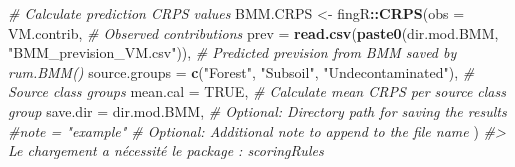 \documentclass[
]{article}
\newenvironment{Shaded}{\begin{snugshade}}{\end{snugshade}}
\newcommand{\AttributeTok}[1]{\textcolor[rgb]{0.13,0.29,0.53}{#1}}
\newcommand{\CommentTok}[1]{\textcolor[rgb]{0.56,0.35,0.01}{\textit{#1}}}
\newcommand{\ConstantTok}[1]{\textcolor[rgb]{0.56,0.35,0.01}{#1}}
\newcommand{\DecValTok}[1]{\textcolor[rgb]{0.00,0.00,0.81}{#1}}
\newcommand{\FunctionTok}[1]{\textcolor[rgb]{0.13,0.29,0.53}{\textbf{#1}}}
\newcommand{\NormalTok}[1]{#1}
\newcommand{\OtherTok}[1]{\textcolor[rgb]{0.56,0.35,0.01}{#1}}
\newcommand{\SpecialCharTok}[1]{\textcolor[rgb]{0.81,0.36,0.00}{\textbf{#1}}}
\newcommand{\StringTok}[1]{\textcolor[rgb]{0.31,0.60,0.02}{#1}}
\begin{document}
\begin{Shaded}
\begin{Highlighting}[]
\CommentTok{\# Calculate prediction CRPS values}
\NormalTok{BMM.CRPS }\OtherTok{\textless{}{-}}\NormalTok{ fingR}\SpecialCharTok{::}\FunctionTok{CRPS}\NormalTok{(}\AttributeTok{obs =}\NormalTok{ VM.contrib,                                             }\CommentTok{\# Observed contributions}
                        \AttributeTok{prev =} \FunctionTok{read.csv}\NormalTok{(}\FunctionTok{paste0}\NormalTok{(dir.mod.BMM, }\StringTok{"BMM\_prevision\_VM.csv"}\NormalTok{)), }\CommentTok{\# Predicted prevision from BMM saved by \textasciigrave{}rum.BMM()\textasciigrave{}}
                        \AttributeTok{source.groups =} \FunctionTok{c}\NormalTok{(}\StringTok{"Forest"}\NormalTok{, }\StringTok{"Subsoil"}\NormalTok{, }\StringTok{"Undecontaminated"}\NormalTok{),   }\CommentTok{\# Source class groups}
                        \AttributeTok{mean.cal =} \ConstantTok{TRUE}\NormalTok{,                                              }\CommentTok{\# Calculate mean CRPS per source class group}
                        \AttributeTok{save.dir =}\NormalTok{ dir.mod.BMM,                                       }\CommentTok{\# Optional: Directory path for saving the results}
                        \CommentTok{\#note = "example"                                             \# Optional: Additional note to append to the file name}
\NormalTok{                        )}
\CommentTok{\#\textgreater{} Le chargement a nécessité le package : scoringRules}
\end{Highlighting}
\end{Shaded}

\begin{Shaded}
\end{Shaded}
\end{document}
